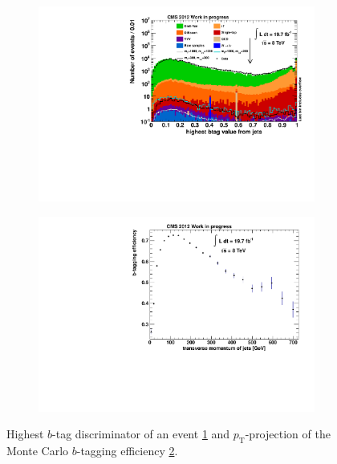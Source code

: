 \begin{figure}[htb!]
  \centering
  \begin{subfigure}[b]{0.495\textwidth}
    \centering
    \includegraphics[width=\textwidth]{plots/1st_btag.pdf}
    \caption{\label{fig:1st_btag}}
  \end{subfigure}
  \begin{subfigure}[b]{0.495\textwidth}
    \centering
    \includegraphics[width=\textwidth]{plots/b_proj.pdf}
    \caption{\label{fig:b_proj}}
  \end{subfigure}
  \caption{Highest $b$-tag discriminator of an event \ref{fig:1st_btag} and $p_{\text{T}}$-projection of the Monte Carlo $b$-tagging efficiency \ref{fig:b_proj}.}
  \label{fig:btag}
\end{figure}

